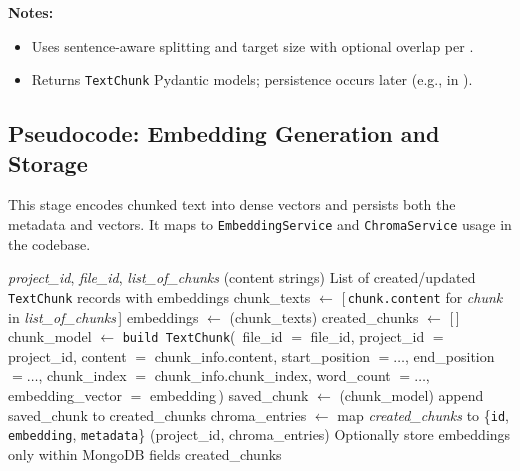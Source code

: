 \textbf{Notes:}
\begin{itemize}
    \item Uses sentence-aware splitting and target size with optional overlap per \texttt{}.
    \item Returns \texttt{TextChunk} Pydantic models; persistence occurs later (e.g., in \texttt{}).
\end{itemize}

\subsection{Pseudocode: Embedding Generation and Storage}

This stage encodes chunked text into dense vectors and persists both the metadata and vectors. It maps to \texttt{EmbeddingService} and \texttt{ChromaService} usage in the codebase.

\begin{algorithm}[H]
\caption{GenerateAndPersistEmbeddings}
\small\begin{algorithmic}[1]
\Require \textit{project\_id}, \textit{file\_id}, \textit{list\_of\_chunks} (content strings)
\Ensure List of created/updated \texttt{TextChunk} records with embeddings
\State chunk\_texts $\leftarrow$ [\,\texttt{chunk.content} for \textit{chunk} in \textit{list\_of\_chunks}\,]
\State embeddings $\leftarrow$ \texttt{}(chunk\_texts)
\State created\_chunks $\leftarrow$ [\,]
    \State chunk\_model $\leftarrow$ \texttt{build TextChunk}(\,
        file\_id $=$ file\_id,\; project\_id $=$ project\_id,
        \Statex \hspace{4em} content $=$ chunk\_info.content,\; start\_position $= \dots$,\; end\_position $= \dots$,
        \Statex \hspace{4em} chunk\_index $=$ chunk\_info.chunk\_index,\; word\_count $= \dots$,
        \Statex \hspace{4em} embedding\_vector $=$ embedding\,)
    \State saved\_chunk $\leftarrow$ \texttt{}(chunk\_model)
    \State append saved\_chunk to created\_chunks
\EndFor
{}
    \State chroma\_entries $\leftarrow$ map \textit{created\_chunks} to \{\texttt{id}, \texttt{embedding}, \texttt{metadata}\}
    \State \texttt{}(project\_id, chroma\_entries)
\Else
    \State Optionally store embeddings only within MongoDB fields
\EndIf
\State \Return created\_chunks
\end{algorithmic}\normalsize
\end{algorithm}
\FloatBarrier

